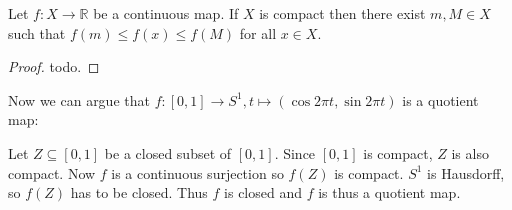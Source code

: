 \begin{theorem}
    Let \( f: X \to \mathbb{R} \) be a continuous map.
    If \( X \) is compact then there exist \( m, M \in X \)
    such that \( f(m) \le f(x) \le f(M) \) for all \( x \in X \).
\end{theorem}

\begin{proof}
   todo. 
\end{proof}

Now we can argue that \( f: [0, 1] \to S^1, t \mapsto (\cos 2\pi t, \sin 2\pi t) \) is a quotient map:

\begin{example}
  Let \( Z \subseteq [0, 1]  \) be a closed subset of \( [0, 1] \).
  Since \( [0, 1] \) is compact, \( Z \) is also compact.
  Now \( f \) is a continuous surjection so \( f(Z) \) is compact.
  \( S^1 \) is Hausdorff, so \( f(Z) \) has to be closed.
  Thus \( f \) is closed and \( f \) is thus a quotient map.
\end{example}

